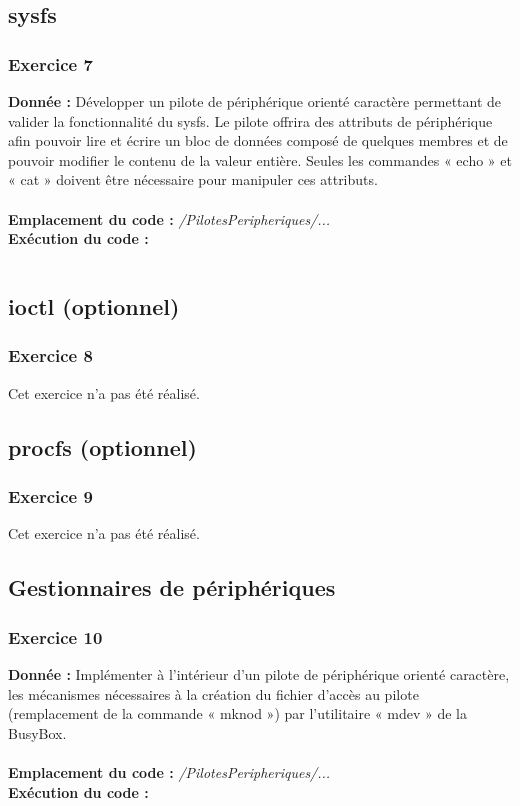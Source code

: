 \subsection{sysfs}
\subsubsection{Exercice 7}
\textbf{Donnée : } Développer	un	pilote	de	périphérique	orienté	caractère	permettant	de	valider	la	fonctionnalité	du	
sysfs.	Le	pilote		offrira	des	attributs	de	périphérique	afin	pouvoir	lire	et	écrire	un	bloc	de	données	
composé	de	quelques	membres	et	de	pouvoir	modifier	le	contenu	de	la	valeur	entière.	Seules	les	
commandes	« echo » et	« cat » doivent	être	nécessaire	pour	manipuler	ces	attributs.\\\\
\textbf{Emplacement du code : } \textit{/PilotesPeripheriques/...}\\

\textbf{Exécution du code : } \\
\begin{lstlisting}

\end{lstlisting}

\subsection{ioctl (optionnel)}
\subsubsection{Exercice 8}
Cet exercice n'a pas été réalisé.

\subsection{procfs (optionnel)}
\subsubsection{Exercice 9}
Cet exercice n'a pas été réalisé.

\subsection{Gestionnaires de périphériques}
\subsubsection{Exercice 10}
\textbf{Donnée : } Implémenter	à	l’intérieur	d’un	pilote	de	périphérique	orienté	caractère,	les	mécanismes	
nécessaires	à	la	création	du	fichier	d’accès	au	pilote	(remplacement	de	la	commande	« mknod »)	
par	l’utilitaire	« mdev »	de	la	BusyBox.\\\\
\textbf{Emplacement du code : } \textit{/PilotesPeripheriques/...}\\

\textbf{Exécution du code : } \\
\begin{lstlisting}

\end{lstlisting}








